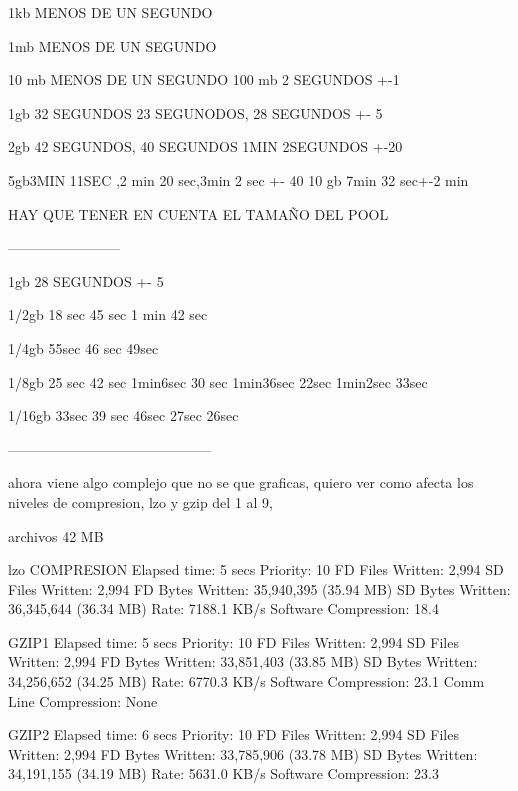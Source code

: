 
\newpage
1kb MENOS DE UN SEGUNDO

1mb MENOS DE UN SEGUNDO

10 mb MENOS DE UN SEGUNDO
100 mb 2 SEGUNDOS +-1

1gb 32 SEGUNDOS 23 SEGUNODOS, 28 SEGUNDOS +- 5

2gb 42 SEGUNDOS, 40 SEGUNDOS 1MIN 2SEGUNDOS +-20

5gb3MIN 11SEC ,2 min 20 sec,3min 2 sec +- 40
10 gb 7min  32 sec+-2 min 


HAY QUE TENER EN CUENTA EL TAMAÑO DEL POOL
\newpage








------------------------

1gb 28 SEGUNDOS +- 5

1/2gb 18 sec 45 sec 1 min 42 sec

1/4gb 55sec  46 sec 49sec

1/8gb 25 sec 42 sec 1min6sec 30 sec 1min36sec 22sec 1min2sec 33sec
 
1/16gb 33sec 39 sec 46sec 27sec 26sec


--------------------------------------------



ahora viene algo complejo que no se que graficas, quiero ver como afecta los niveles de compresion, lzo y gzip del 1 al 9, 





archivos 42 MB

lzo COMPRESION
  Elapsed time:           5 secs
  Priority:               10
  FD Files Written:       2,994
  SD Files Written:       2,994
  FD Bytes Written:       35,940,395 (35.94 MB)
  SD Bytes Written:       36,345,644 (36.34 MB)
  Rate:                   7188.1 KB/s
  Software Compression:   18.4%
  
GZIP1 
  Elapsed time:           5 secs
  Priority:               10
  FD Files Written:       2,994
  SD Files Written:       2,994
  FD Bytes Written:       33,851,403 (33.85 MB)
  SD Bytes Written:       34,256,652 (34.25 MB)
  Rate:                   6770.3 KB/s
  Software Compression:   23.1%
  Comm Line Compression:  None

  
GZIP2
  Elapsed time:           6 secs
  Priority:               10
  FD Files Written:       2,994
  SD Files Written:       2,994
  FD Bytes Written:       33,785,906 (33.78 MB)
  SD Bytes Written:       34,191,155 (34.19 MB)
  Rate:                   5631.0 KB/s
  Software Compression:   23.3%

